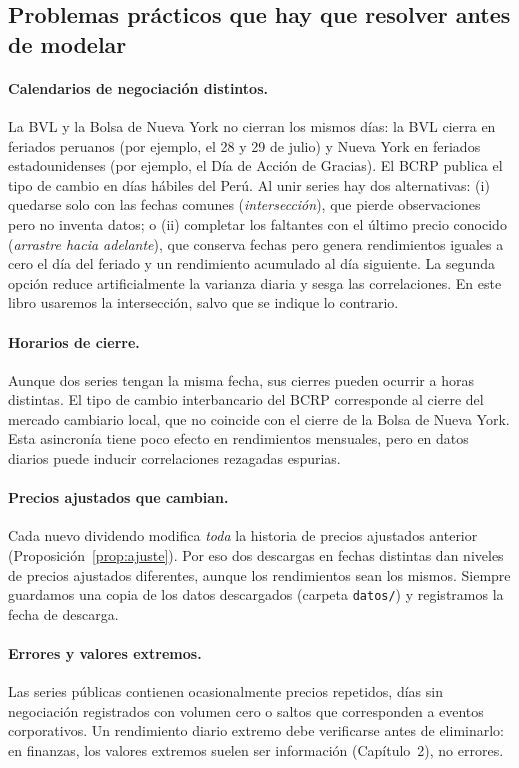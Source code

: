 \subsection{Problemas prácticos que hay que resolver antes de modelar}

\paragraph{Calendarios de negociación distintos.} La BVL y la Bolsa de Nueva York no cierran los mismos
días: la BVL cierra en feriados peruanos (por ejemplo, el 28 y 29 de julio) y Nueva York en feriados
estadounidenses (por ejemplo, el Día de Acción de Gracias). El BCRP publica el tipo de cambio en días
hábiles del Perú. Al unir series hay dos alternativas: (i) quedarse solo con las fechas comunes
(\emph{intersección}), que pierde observaciones pero no inventa datos; o (ii) completar los faltantes con
el último precio conocido (\emph{arrastre hacia adelante}), que conserva fechas pero genera rendimientos
iguales a cero el día del feriado y un rendimiento acumulado al día siguiente. La segunda opción reduce
artificialmente la varianza diaria y sesga las correlaciones. En este libro usaremos la intersección,
salvo que se indique lo contrario.

\paragraph{Horarios de cierre.} Aunque dos series tengan la misma fecha, sus cierres pueden ocurrir a
horas distintas. El tipo de cambio interbancario del BCRP corresponde al cierre del mercado cambiario
local, que no coincide con el cierre de la Bolsa de Nueva York. Esta asincronía tiene poco efecto en
rendimientos mensuales, pero en datos diarios puede inducir correlaciones rezagadas espurias.

\paragraph{Precios ajustados que cambian.} Cada nuevo dividendo modifica \emph{toda} la historia de
precios ajustados anterior (Proposición~\ref{prop:ajuste}). Por eso dos descargas en fechas distintas
dan niveles de precios ajustados diferentes, aunque los rendimientos sean los mismos. Siempre guardamos
una copia de los datos descargados (carpeta \texttt{datos/}) y registramos la fecha de descarga.

\paragraph{Errores y valores extremos.} Las series públicas contienen ocasionalmente precios repetidos,
días sin negociación registrados con volumen cero o saltos que corresponden a eventos corporativos. Un
rendimiento diario extremo debe verificarse antes de eliminarlo: en finanzas, los valores extremos suelen
ser información (Capítulo~2), no errores.


